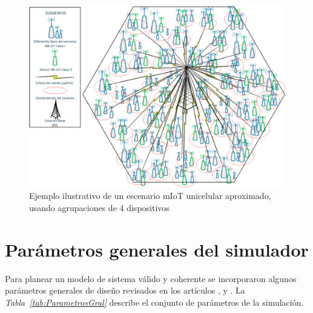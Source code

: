 \begin{figure}[th]
\centering
\includegraphics[scale=.65]{Figures/Escenario mIoT unicelda}
\decoRule
\caption[Ejemplo ilustrativo de un escenario mIoT unicelular aproximado, usando agrupaciones de 4 dispositivos]{Ejemplo ilustrativo de un escenario mIoT unicelular aproximado, usando agrupaciones de 4 dispositivos}
\label{fig:EscenarioMTC}
\end{figure}
\section{Parámetros generales del simulador}\label{parametrossimulador}

Para planear un modelo de sistema válido y coherente se incorporaron algunos parámetros generales de diseño revisados en los artículos \parencite{Shahini2019}, \parencite{Mostafa2019} y \parencite{Gupta2018}. La \textit{Tabla~\ref{tab:ParametrosGral}} describe el conjunto de parámetros de la simulación.

